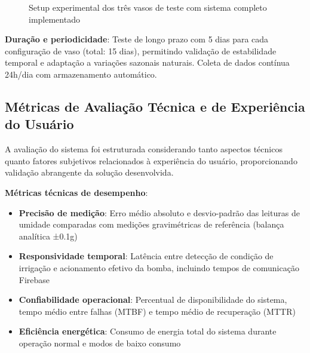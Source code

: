 \documentclass[twoside,english,brazilian]{UNISINOSmonografia}
\begin{document}
\begin{figure}[htbp]
\centering
\caption{Setup experimental dos três vasos de teste com sistema completo implementado}
\label{fig:setup_experimental}
\end{figure}

\textbf{Duração e periodicidade}: Teste de longo prazo com 5 dias para cada configuração de vaso (total: 15 dias), permitindo validação de estabilidade temporal e adaptação a variações sazonais naturais. Coleta de dados contínua 24h/dia com armazenamento automático.

\subsection{Métricas de Avaliação Técnica e de Experiência do Usuário}

A avaliação do sistema foi estruturada considerando tanto aspectos técnicos quanto fatores subjetivos relacionados à experiência do usuário, proporcionando validação abrangente da solução desenvolvida.

\textbf{Métricas técnicas de desempenho}:
\begin{itemize}
\item \textbf{Precisão de medição}: Erro médio absoluto e desvio-padrão das leituras de umidade comparadas com medições gravimétricas de referência (balança analítica ±0.1g)
\item \textbf{Responsividade temporal}: Latência entre detecção de condição de irrigação e acionamento efetivo da bomba, incluindo tempos de comunicação Firebase
\item \textbf{Confiabilidade operacional}: Percentual de disponibilidade do sistema, tempo médio entre falhas (MTBF) e tempo médio de recuperação (MTTR)
\item \textbf{Eficiência energética}: Consumo de energia total do sistema durante operação normal e modos de baixo consumo
\end{itemize}
\end{document}

